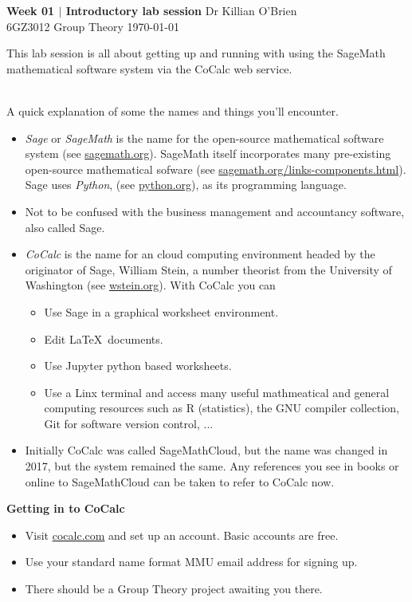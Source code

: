 \documentclass[oneside,10pt]{amsart}
\newcommand{\cbox}[1]{\begin{tcolorbox}[left=0.5mm,right=0.5mm,top=0.5mm,bottom=0.5mm, boxsep=2pt, boxrule=0pt,colback=black]\color{white}\sffamily #1 \end{tcolorbox}}
\newcommand{\tuttitle}[4]{\cbox{\textbf{#1} \hfill {#2}\\{#3} \hfill {\Small #4}}\vskip 4pt}
\newcommand{\topic}[1]{\cbox{\textbf{#1}}\vskip 4pt}
\newcommand{\subtopic}[1]{\tcbox[nobeforeafter, left=0mm,right=10mm,top=0.3mm,bottom=0mm, boxsep=2pt, boxrule=0pt,colback=black!50]{\color{white}\sffamily #1}\\}
\begin{document}
\tuttitle{Week 01 $|$ Introductory lab session}{Dr Killian O'Brien}{6GZ3012 Group Theory}{\today}

This lab session is all about getting up and running with using the SageMath mathematical software system via the CoCalc web service.

\subtopic{Names and things:}
A quick explanation of some the names and things you'll encounter.
\begin{itemize}
\item
\emph{Sage} or \emph{SageMath} is the name for the open-source mathematical software system (see \url{sagemath.org}). SageMath itself incorporates many pre-existing open-source mathematical sofware (see \url{sagemath.org/links-components.html}). Sage uses \emph{Python}, (see \url{python.org}), as its programming language.
\item
Not to be confused with the business management and accountancy software, also called Sage.
\item
\emph{CoCalc} is the name for an cloud computing environment headed by the originator of Sage, William Stein, a number theorist from the University of Washington (see \url{wstein.org}). With CoCalc you can
\begin{itemize}
\item
Use Sage in a graphical worksheet environment.
\item
Edit \LaTeX\ documents.
\item
Use Jupyter python based worksheets.
\item
Use a Linx terminal and access many useful mathmeatical and general computing resources such as R (statistics), the GNU compiler collection, Git for software version control, ...
\end{itemize}
\item
Initially CoCalc was called SageMathCloud, but the name was changed in 2017, but the system remained the same. Any references you see in books or online to SageMathCloud can be taken to refer to CoCalc now.
\end{itemize}

\topic{Getting in to CoCalc}
\begin{itemize}
\item
Visit \url{cocalc.com} and set up an account. Basic accounts are free.
\item
Use your standard name format MMU email address for signing up.
\item
There should be a Group Theory project awaiting you there.
\end{itemize}
\end{document}
